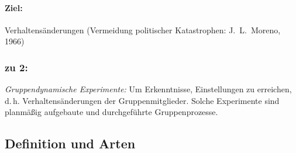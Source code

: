 \documentclass[12pt]{scrartcl}
\begin{document}
\paragraph{Ziel:} Verhaltensänderungen (Vermeidung politischer Katastrophen:
J.~L.~Moreno, 1966)

\subsubsection*{zu 2:}
\emph{Gruppendynamische Experimente:} Um Erkenntnisse, Einstellungen zu
erreichen, d.\,h. Verhaltensänderungen der Gruppenmitglieder. Solche
Experimente sind planmäßig aufgebaute und durchgeführte Gruppenprozesse.

\subsection{Definition und Arten}
\end{document}

